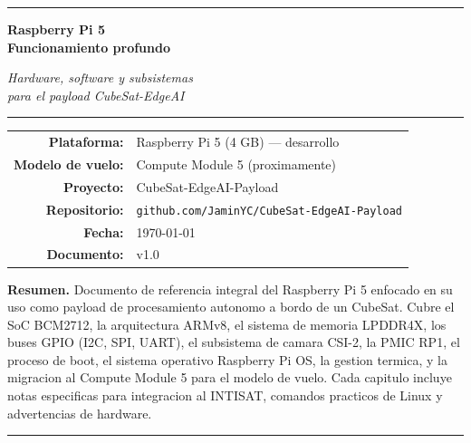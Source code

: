 \documentclass[11pt,a4paper,oneside]{report}
\begin{document}
\begin{titlepage}
\centering
\vspace*{1cm}
{\color{intisat}\rule{\textwidth}{2pt}}
\vspace{0.6cm}

{\Huge\bfseries\color{intisat} Raspberry Pi 5}\\[0.3em]
{\LARGE\bfseries Funcionamiento profundo}

\vspace{0.7cm}
{\Large\itshape Hardware, software y subsistemas\\
para el payload CubeSat-EdgeAI}

\vspace{1cm}
{\color{intisataccent}\rule{0.6\textwidth}{1pt}}

\vspace{2cm}

\begin{tabular}{rl}
\textbf{Plataforma:} & Raspberry Pi 5 (4 GB) --- desarrollo \\
\textbf{Modelo de vuelo:} & Compute Module 5 (proximamente) \\
\textbf{Proyecto:} & CubeSat-EdgeAI-Payload \\
\textbf{Repositorio:} & \texttt{github.com/JaminYC/CubeSat-EdgeAI-Payload} \\
\textbf{Fecha:} & \today \\
\textbf{Documento:} & v1.0
\end{tabular}

\vfill

\begin{minipage}{0.85\textwidth}
\textbf{Resumen.}\quad
Documento de referencia integral del Raspberry Pi 5 enfocado en su uso
como payload de procesamiento autonomo a bordo de un CubeSat. Cubre el
SoC BCM2712, la arquitectura ARMv8, el sistema de memoria LPDDR4X, los
buses GPIO (I2C, SPI, UART), el subsistema de camara CSI-2, la PMIC
RP1, el proceso de boot, el sistema operativo Raspberry Pi OS, la
gestion termica, y la migracion al Compute Module 5 para el modelo de
vuelo. Cada capitulo incluye notas especificas para integracion al
INTISAT, comandos practicos de Linux y advertencias de hardware.
\end{minipage}

\vspace{1.2cm}
{\color{intisat}\rule{\textwidth}{2pt}}
\end{titlepage}
\end{document}
